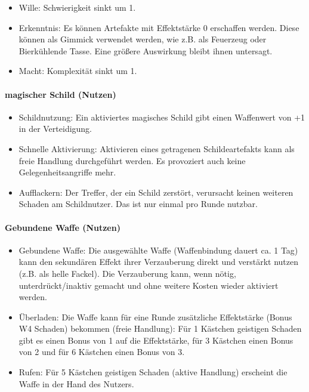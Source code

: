 \documentclass{article}
\begin{document}
\begin{itemize}
\item Wille: Schwierigkeit sinkt um 1.
\item Erkenntnis: Es können Artefakte mit Effektstärke 0 erschaffen werden. Diese können als Gimmick verwendet werden, wie z.B. als Feuerzeug oder Bierkühlende Tasse. Eine größere Auswirkung bleibt ihnen untersagt.
\item Macht: Komplexität sinkt um 1.
\end{itemize}

\paragraph{magischer Schild (Nutzen)}

\begin{itemize}
\item Schildnutzung: Ein aktiviertes magisches Schild gibt einen Waffenwert von +1 in der Verteidigung.
\item Schnelle Aktivierung: Aktivieren eines getragenen Schildeartefakts kann als freie Handlung durchgeführt werden. Es provoziert auch keine Gelegenheitsangriffe mehr.
\item Aufflackern: Der Treffer, der ein Schild zerstört, verursacht keinen weiteren Schaden am Schildnutzer. Das ist nur einmal pro Runde nutzbar.
\end{itemize}

\paragraph{Gebundene Waffe (Nutzen)}

\begin{itemize}
\item Gebundene Waffe: Die ausgewählte Waffe (Waffenbindung dauert ca. 1 Tag) kann den sekundären Effekt ihrer Verzauberung direkt und verstärkt nutzen (z.B. als helle Fackel). Die Verzauberung kann, wenn nötig, unterdrückt/inaktiv gemacht und ohne weitere Kosten wieder aktiviert werden.
\item Überladen: Die Waffe kann für eine Runde zusätzliche Effektstärke (Bonus W4 Schaden) bekommen (freie Handlung): Für 1 Kästchen geistigen Schaden gibt es einen Bonus von 1 auf die Effektstärke, für 3 Kästchen einen Bonus von 2 und für 6 Kästchen einen Bonus von 3.
\item Rufen: Für 5 Kästchen geistigen Schaden (aktive Handlung) erscheint die Waffe in der Hand des Nutzers.
\end{itemize}
\end{document}

